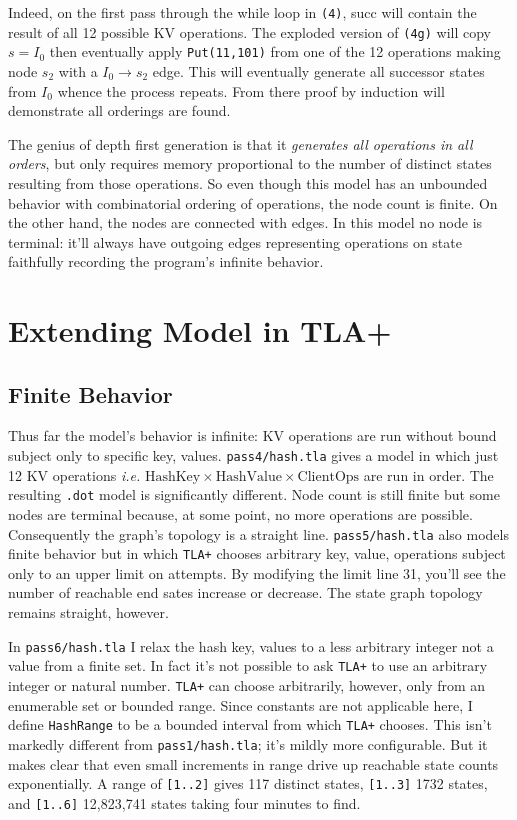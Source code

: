 \documentclass[twocolumn]{article}
\begin{document}
Indeed, on the first pass through the while loop in \texttt{(4)}, succ will contain the result of all 12 possible KV operations. The exploded version of \texttt{(4g)} will copy $s=I_0$ then eventually apply \texttt{Put(11,101)} from one of the 12 operations making node $s_2$ with a $I_0 \rightarrow s_2$ edge. This will eventually generate all successor states from $I_0$ whence the process repeats. From there proof by induction will demonstrate all orderings are found.
 
The genius of depth first generation is that it \emph{generates all operations in all orders}, but only requires memory proportional to the number of distinct states resulting from those operations. So even though this model has an unbounded behavior with combinatorial ordering of operations, the node count is finite. On the other hand, the nodes are connected with edges. In this model no node is terminal: it'll always have outgoing edges representing operations on state faithfully recording the program's infinite behavior.

\section{Extending Model in TLA+}

\subsection{Finite Behavior}

Thus far the model's behavior is infinite: KV operations are run without bound subject only to specific key, values. \texttt{pass4/hash.tla} gives a model in which just 12 KV operations \emph{i.e.} $\text{HashKey} \times \text{HashValue} \times \text{ClientOps}$ are run in order. The resulting \texttt{.dot} model is significantly different. Node count is still finite but some nodes are terminal because, at some point, no more operations are possible. Consequently the graph's topology is a straight line. \texttt{pass5/hash.tla} also models finite behavior but in which \texttt{TLA+} chooses arbitrary key, value, operations subject only to an upper limit on attempts. By modifying the limit line 31, you'll see the number of reachable end sates increase or decrease. The state graph topology remains straight, however.

In \texttt{pass6/hash.tla} I relax the hash key, values to a less arbitrary integer not a value from a finite set. In fact it's not possible to ask \texttt{TLA+} to use an arbitrary integer or natural number. \texttt{TLA+} can choose arbitrarily, however, only from an enumerable set or bounded range. Since constants are not applicable here, I define \texttt{HashRange} to be a bounded interval from which \texttt{TLA+} chooses. This isn't markedly different from \texttt{pass1/hash.tla}; it's mildly more configurable. But it makes clear that even small increments in range drive up reachable state counts exponentially. A range of \texttt{[1..2]} gives 117 distinct states, \texttt{[1..3]} 1732 states, and \texttt{[1..6]} 12,823,741 states taking four minutes to find.
\end{document}
